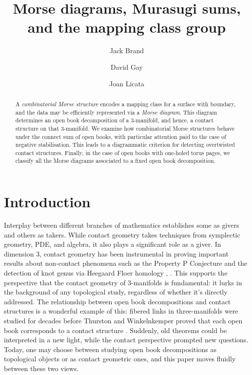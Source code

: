 \documentclass{amsart}
\title{Morse diagrams, Murasugi sums, and the mapping class group}
\author[Jack Brand]{Jack Brand}
\author[David T. Gay]{David Gay}
\author[Joan Licata]{Joan Licata}
\theoremstyle{definition}
\begin{document}
\maketitle

\begin{abstract}   A \textit{combinatorial Morse structure} encodes a mapping class for a surface with boundary, and the data may be efficiently represented via a \textit{Morse diagram}.  This  diagram  determines  an open book decomposition of a 3-manifold, and hence, a contact structure on that 3-manifold.   We examine how combinatorial Morse structures behave under the connect sum of open books, with particular attention paid to the case of negative stabilisation.  This leads to a diagrammatic criterion for detecting overtwisted contact structures.  Finally, in the case of open books with one-holed torus pages, we classify all the Morse diagrams associated to a fixed open book decomposition.
\end{abstract}

\section{Introduction}


Interplay between different branches of mathematics establishes some as givers and others as takers.  While  contact geometry takes techniques from symplectic geometry, PDE, and algebra, it also plays a significant role as a giver.  In dimension 3, contact geometry has been instrumental in proving important results about non-contact phenomena such as the Property P Conjecture and the detection of knot genus via Heegaard Floer homology  \cite{KM}, \cite{OSzgenus}.  This supports the perspective that the contact geometry of 3-manifolds is fundamental: it lurks in the background of any topological study, regardless of whether it's directly addressed.  The relationship between open book decompositions and contact structures is a wonderful example of this: fibered links in three-manifolds were studied for decades before  Thurston and Winkelnkemper proved that each open book corresponds to a contact structure \cite{TW}.  Suddenly, old theorems could be interpreted in a new light, while the contact perspective prompted new questions.  Today, one may choose between studying open book decompositions as topological objects or as contact geometric ones, and this paper moves fluidly between these two views.  
\end{document}
